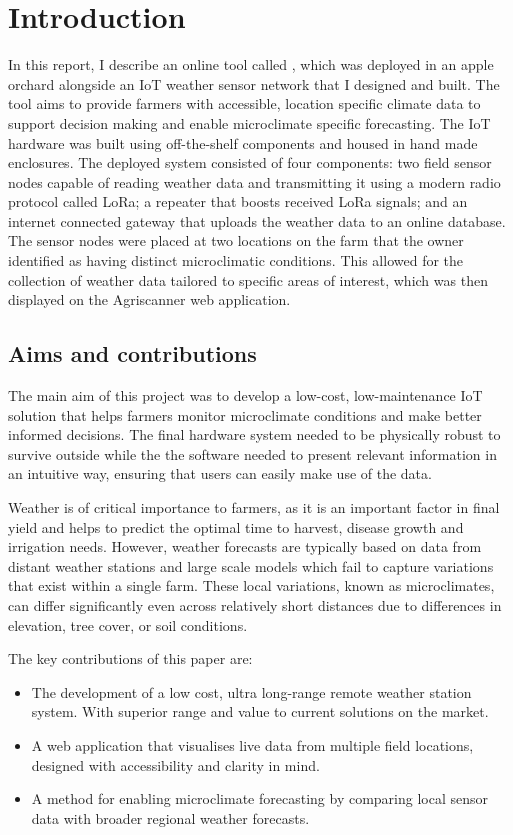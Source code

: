 \section{Introduction}

In this report, I describe an online tool called \myReportTitle{}, which was
deployed in an apple orchard alongside an IoT weather sensor network that I
designed and built. The tool aims to provide farmers with accessible, location
specific climate data to support decision making and enable microclimate
specific forecasting. The IoT hardware was built using off-the-shelf components
and housed in hand made enclosures. The deployed system consisted of four
components: two field sensor nodes capable of reading weather data and
transmitting it using a modern radio protocol called LoRa; a repeater that
boosts received LoRa signals; and an internet connected gateway that uploads the
weather data to an online database. The sensor nodes were placed at two
locations on the farm that the owner identified as having distinct microclimatic
conditions. This allowed for the collection of weather data tailored to specific
areas of interest, which was then displayed on the Agriscanner web application.


\subsection{Aims and contributions}

The main aim of this project was to develop a low-cost, low-maintenance IoT
solution that helps farmers monitor microclimate conditions and make better
informed decisions. The final hardware system needed to be physically robust to
survive outside while the the software needed to present relevant information in
an intuitive way, ensuring that users can easily make use of the data.

Weather is of critical importance to farmers, as it is an important factor in
final yield and helps to predict the optimal time to harvest, disease growth and
irrigation needs. However, weather forecasts are typically based on data from
distant weather stations and large scale models which fail to capture variations
that exist within a single farm. These local variations, known as microclimates,
can differ significantly even across relatively short distances due to
differences in elevation, tree cover, or soil conditions.

The key contributions of this paper are:

\begin{itemize}
    \item The development of a low cost, ultra long-range remote weather station
    system. With superior range and value to current solutions on the market.
    \item A web application that visualises live data from multiple field
    locations, designed with accessibility and clarity in mind.
    \item A method for enabling microclimate forecasting by comparing local
    sensor data with broader regional weather forecasts.
\end{itemize}

